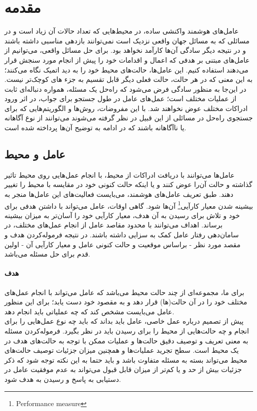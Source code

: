 \section{مقدمه}
	عامل‌های هوشمند واکنشی ساده، در محیط‌هایی که تعداد حالات آن زیاد است و در مسائلی که به مسائل جهان واقعی نزدیک است نمی‌توانند بازدهی مناسبی داشته باشند و در نتیجه دیگر سادگی آن‌ها کارآمد نخواهد بود. برای حل مسائل واقعی، می‌توانیم از عامل‌های مبتنی بر هدفی که اعمال و اقدامات خود را پیش از انجام مورد سنجش قرار می‌دهند استفاده کنیم. این عامل‌ها، حالت‌های محیط خود را به دید اتمیک نگاه می‌کنند؛ به این معنی که در هر حالت، حالت فعلی دیگر قابل تقسیم به جزء های کوچک‌تر نیست. در این‌جا به منظور سادگی فرض می‌شود که راه‌حل یک مسئله، همواره دنباله‌ای ثابت از عملیات مختلف است؛ عمل‌های عامل در طول جستجو برای جواب، در اثر ورود ادراکات مختلف عوض نخواهند شد. با این مفروضات، روش‌ها و الگوریتم‌هایی که برای جستجوی راه‌حل در مسائلی از این قبیل در نظر گرفته می‌شوند می‌توانند از نوع آگاهانه یا ناآگاهانه باشند که در ادامه به توضیح آن‌ها پرداخته شده است.
	\subsection{عامل و محیط}
	عامل‌‌ها می‌توانند با دریافت ادراکات از محیط، با انجام عمل‌هایی روی محیط تاثیر گذاشته و حالت آن‌را عوض کنند و یا اینکه حالت کنونی خود در مقایسه با محیط را تغییر دهند. طبق تعریف عامل‌های هوشمند، می‌بایست فعالیت‌های این عامل‌ها منجر به بیشینه شدن معیار کارآیی\footnote{Performance measure} آن‌ها شود. گاهی اوقات، عامل می‌تواند با داشتن هدفی برای خود و تلاش برای رسیدن به آن هدف، معیار کارآیی خود را آسان‌تر به میزان بیشینه برساند. اهداف می‌توانند با محدود مقاصد عامل از انجام عمل‌های مختلف، در سامان‌دهی رفتار عامل کمک به سزایی داشته باشند. در نتیجه فرموله‌کردن هدف و مقصد مورد نظر - براساس موقعیت و حالت کنونی عامل و معیار کارآیی آن - اولین قدم برای حل مسئله می‌باشد.\\
	\paragraph{هدف}
	برای ما، مجموعه‌ای از چند حالت محیط می‌باشد که عامل می‌تواند با انجام عمل‌های مختلف خود را در آن حالت(ها) قرار دهد و به مقصود خود دست یابد؛ برای این منظور عامل می‌بایست مشخص کند که چه عملیاتی باید انجام دهد.\\
	پیش از تصمیم درباره عمل خاصی، عامل باید بداند که باید چه نوع عمل‌هایی را برای انجام و چه حالت‌هایی از محیط را برای رسیدن باید در نظر بگیرد. فرموله‌کردن مسئله به معنی تعریف و توصیف دقیق حالت‌ها و عملیات ممکن با توجه به حالت‌های هدف در یک محیط است. سطح تجرید عملیات‌ها و همچنین میزان جزئیات توصیف حالت‌های محیط می‌تواند بسته به مسئله متفاوت باشد و باید حتما به این نکته توجه شود که ذکر جزئیات بیش از حد و یا کم‌تر از میزان قابل قبول می‌تواند به عدم موفقیت عامل در دستیابی به پاسخ و رسیدن به هدف شود.
